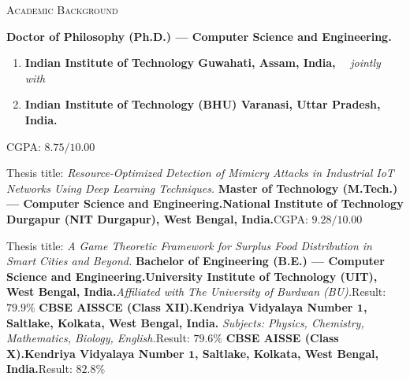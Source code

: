 \begin{rubric}{\textsc{Academic Background}}

\entry*[$2021~ - $ Present]%
	\textbf{Doctor of Philosophy (Ph.D.) --- Computer Science and Engineering.}
    \vspace*{-5pt}
    \begin{enumerate}
        \setlength{\itemsep}{1pt}
        \setlength{\parskip}{1pt}
        \item[\circled{1}] \textbf{Indian Institute of Technology Guwahati, Assam, India,} ~~\textit{jointly with}
        \item[\circled{2}] \textbf{Indian Institute of Technology (BHU) Varanasi, Uttar Pradesh, India.}
    \end{enumerate}
    \vspace*{-5pt}
    CGPA: $8.75 / 10.00$
	\par Thesis title: \emph{Resource-Optimized Detection of Mimicry Attacks in Industrial IoT Networks Using Deep Learning Techniques.}
%
\entry*[$2019 - 2021$]%
	\textbf{Master of Technology (M.Tech.) --- Computer Science and Engineering.}\newline \textbf{National Institute of Technology Durgapur (NIT Durgapur), West Bengal, India.}\newline CGPA: $9.28 / 10.00$
	\par Thesis title: \emph{A Game Theoretic Framework for Surplus Food Distribution in Smart Cities and Beyond.}
%
\entry*[$2006 - 2010$]%
	\textbf{Bachelor of Engineering (B.E.) --- Computer Science and Engineering.}\newline \textbf{University Institute of Technology (UIT), West Bengal, India.}\newline \textit{Affiliated with The University of Burdwan (BU).}\newline Result: $79.9\%$
%
\entry*[\phantom{$2004~ - $} $2006$]%
	\textbf{CBSE AISSCE (Class XII).}\newline \textbf{Kendriya Vidyalaya Number $\mathbf{1}$, Saltlake, Kolkata, West Bengal, India.}\newline
    \emph{Subjects: Physics, Chemistry, Mathematics, Biology, English.}\newline Result: $79.6\%$
%
\entry*[\phantom{$2004~ - $} $2004$]%
	\textbf{CBSE AISSE (Class X).}\newline \textbf{Kendriya Vidyalaya Number $\mathbf{1}$, Saltlake, Kolkata, West Bengal, India.}\newline Result: $82.8\%$
\end{rubric}